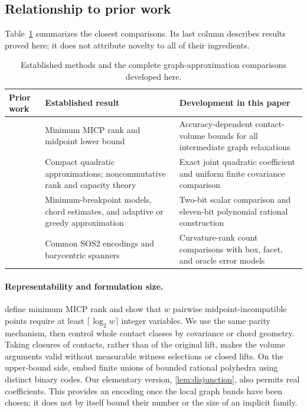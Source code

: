 \subsection{Relationship to prior work}

Table~\ref{tab:result-map} summarizes the closest comparisons. Its last
column describes results proved here; it does not attribute novelty to
all of their ingredients.
\begin{table}[htbp]
\centering\small
\begin{tabular}{@{}>{\raggedright\arraybackslash}p{}>{\raggedright\arraybackslash}p{}>{\raggedright\arraybackslash}p{}@{}}
\toprule
Prior work & Established result & Development in this paper\\
\midrule
\citet{lubin2022} & Minimum MICP rank and midpoint lower bound & Accuracy-dependent contact-volume bounds for all intermediate graph relaxations\\
\citet{beach2022,ggow2020,iqs2018} & Compact quadratic approximations; noncommutative rank and capacity theory & Exact joint quadratic coefficient and uniform finite covariance comparison\\
\citet{rebennack2015,simchowitz2018,codsi2025} & Minimum-breakpoint models, chord estimates, and adaptive or greedy approximation & Two-bit scalar comparison and eleven-bit polynomial rational construction\\
\citet{lyu2026,awerbuch2004} & Common SOS2 encodings and barycentric spanners & Curvature-rank count comparisons with box, facet, and oracle error models\\
\bottomrule
\end{tabular}
\caption{Established methods and the complete graph-approximation comparisons developed here.}
\label{tab:result-map}
\end{table}

\paragraph{Representability and formulation size.}
\citet[Definition 4.3 and Lemma 4.1]{lubin2022} define minimum MICP rank
and show that $w$ pairwise midpoint-incompatible points require at least
$\lceil\log_2w\rceil$ integer variables. We use the same parity mechanism,
then control whole contact classes by covariance or chord geometry.
Taking closures of contacts, rather than of the original lift, makes the
volume arguments valid without measurable witness selections or closed
lifts. On the upper-bound side, \citet[Proposition 1]{vielma2018} embed
finite unions of bounded rational polyhedra using distinct binary codes.
Our elementary version, \cref{lem:disjunction}, also permits real coefficients.
This provides an
encoding once the local graph bands have been chosen; it does not by
itself bound their number or the size of an implicit family.

